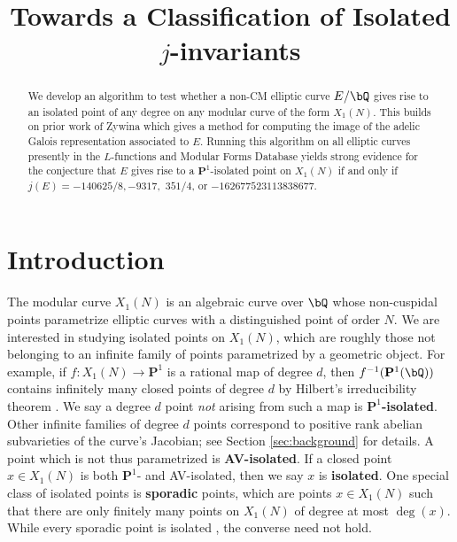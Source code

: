 \documentclass[11pt,reqno]{amsart}
\title{Towards a Classification of Isolated $j$-invariants}
\theoremstyle{plain}
\theoremstyle{definition}
\newcommand{\Q}{\bQ}
\newcommand{\PP}{\mathbf P}
\begin{document}
\begin{abstract}
We develop an algorithm to test whether a non-CM elliptic curve $E/\Q$ gives rise to an isolated point of any degree on any modular curve of the form $X_1(N)$. This builds on prior work of Zywina which gives a method for computing the image of the adelic Galois representation associated to $E$. Running this algorithm on all elliptic curves presently in the $L$-functions and Modular Forms Database yields strong evidence for the conjecture that $E$ gives rise to a $\PP^1$-isolated point on $X_1(N)$ if and only if $j(E)=-140625/8, -9317,$ $351/4$, or $-162677523113838677$.
\end{abstract}

\maketitle

\section{Introduction}
\label{sec:intro}


The modular curve $X_1(N)$ is an algebraic curve over $\Q$ whose non-cuspidal points parametrize elliptic curves with a distinguished point of order $N$. We are interested in studying isolated points on $X_1(N)$, which are roughly those not belonging to an infinite family of points parametrized by a geometric object. For example, if $f\colon X_1(N) \rightarrow \PP^1$ is a rational map of degree $d$, then $f^{-1}(\PP^1(\Q))$ contains infinitely many closed points of degree $d$ by Hilbert's irreducibility theorem \cite[Chapter~9]{serre97}. We say a degree $d$ point \emph{not} arising from such a map is \textbf{$\PP^1$-isolated}. Other infinite families of degree $d$ points correspond to positive rank abelian subvarieties of the curve's Jacobian; see Section \ref{sec:background} for details. A point which is not thus parametrized is \textbf{AV-isolated}. If a closed point $x\in X_1(N)$ is both $\PP^1$- and AV-isolated, then we say $x$ is \textbf{isolated}. One special class of isolated points is \textbf{sporadic} points, which are points $x \in X_1(N)$ such that there are only finitely many points on $X_1(N)$ of degree at most $\deg(x)$. While every sporadic point is isolated \cite[Theorem 4.2]{BELOV}, the converse need not hold.
\end{document}
